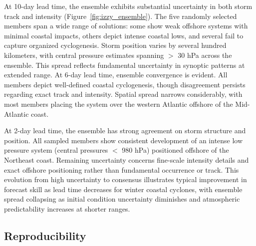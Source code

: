 \documentclass{agujournal2019}
\providecommand{\DIFaddbegin}{} %
\providecommand{\DIFaddend}{} %
\begin{document}
At 10-day lead time, the ensemble exhibits substantial uncertainty in both storm track and intensity (Figure~\ref{fig:izzy_ensemble}). The five randomly selected members span a wide range of solutions: some show weak offshore systems with minimal coastal impacts, others depict intense coastal lows, and several fail to capture organized cyclogenesis. Storm position varies by several hundred kilometers, with central pressure estimates spanning $>$ 30 hPa across the ensemble. This spread reflects fundamental uncertainty in synoptic patterns at extended range. At 6-day lead time, ensemble convergence is evident. All members depict well-defined coastal cyclogenesis, though disagreement persists regarding exact track and intensity. Spatial spread narrows considerably, with most members placing the system over the western Atlantic offshore of the Mid-Atlantic coast.

At 2-day lead time, the ensemble has strong agreement on storm structure and position. All sampled members show consistent development of an intense low pressure system (central pressures $<$ 980 hPa) positioned offshore of the Northeast coast. Remaining uncertainty concerns fine-scale intensity details and exact offshore positioning rather than fundamental occurrence or track. This evolution from high uncertainty to consensus illustrates typical improvement in forecast skill as lead time decreases for winter coastal cyclones, with ensemble spread collapsing as initial condition uncertainty diminishes and atmospheric predictability increases at shorter ranges.

\subsection{Reproducibility}
\DIFaddbegin \label{sec:reproducibility}
\DIFaddend 
\end{document}
